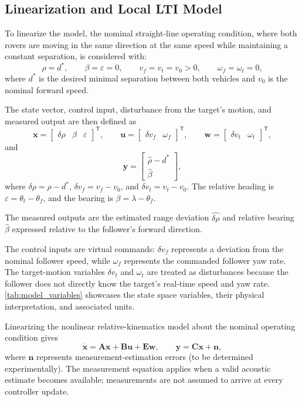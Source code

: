 \documentclass[journal,a4paper]{IEEEtran}
\begin{document}
\subsection{Linearization and Local LTI Model}
\label{sec:linearization}

To linearize the model, the nominal straight-line operating condition, where both rovers are moving in the same direction at the same speed while maintaining a constant separation, is considered with:
\[
\rho=d^\ast,\qquad
\beta=\varepsilon=0,\qquad
v_f=v_t=v_0>0,\qquad
\omega_f=\omega_t=0,
\]
where $d^\ast$ is the desired minimal separation between both vehicles and $v_0$ is the nominal forward speed.

The state vector, control input, disturbance from the target's motion, and measured output are then defined as
\[
\mathbf{x}=
\begin{bmatrix}
\delta\rho & \beta & \varepsilon
\end{bmatrix}^{\mathsf T},
\qquad
\mathbf{u}=
\begin{bmatrix}
\delta v_f & \omega_f
\end{bmatrix}^{\mathsf T},
\qquad
\mathbf{w}=
\begin{bmatrix}
\delta v_t & \omega_t
\end{bmatrix}^{\mathsf T},
\]
and
\[
\mathbf{y}=
\begin{bmatrix}
\hat{\rho}-d^\ast\\
\hat{\beta}
\end{bmatrix},
\]
where $\delta\rho=\rho-d^\ast$, $\delta v_f=v_f-v_0$, and $\delta v_t=v_t-v_0$. The relative heading is $\varepsilon=\theta_t-\theta_f$, and the bearing is $\beta=\lambda-\theta_f$. 

The measured outputs are the estimated range deviation $\hat{\delta\rho}$ and relative bearing $\hat{\beta}$ expressed relative to the follower's forward direction.

The control inputs are virtual commands: $\delta v_f$ represents a deviation from the nominal follower speed, while $\omega_f$ represents the commanded follower yaw rate. The target-motion variables $\delta v_t$ and $\omega_t$ are treated as disturbances because the follower does not directly know the target's real-time speed and yaw rate. \autoref{tab:model_variables} showcases the state space variables, their physical interpretation, and associated units. 

Linearizing the nonlinear relative-kinematics model about the nominal operating condition gives
\begin{equation}
\dot{\mathbf{x}}
=\mathbf{A}\mathbf{x}
+\mathbf{B}\mathbf{u}
+\mathbf{E}\mathbf{w},
\qquad
\mathbf{y}
=\mathbf{C}\mathbf{x}+\mathbf{n},
\label{eq:lin}
\end{equation}
where $\mathbf{n}$ represents measurement-estimation errors (to be determined experimentally). The measurement equation applies when a valid acoustic estimate becomes available; measurements are not assumed to arrive at every controller update.
\end{document}
